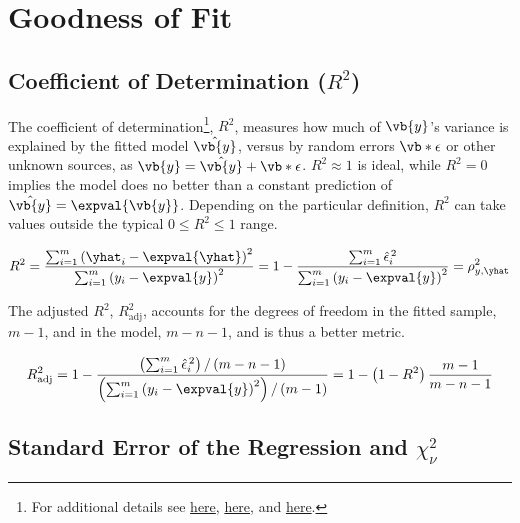 \section{Goodness of Fit}
\label{regression:goodness_of_fit}

\subsection{Coefficient of Determination (\texorpdfstring{$R^{2}$}{R-Squared})}
\label{regression:goodness_of_fit:R2}

The coefficient of determination\footnote{For additional details see
\href{https://economictheoryblog.com/2014/11/05/the-coefficient-of-determination-latex-r2/}{here},
\href{https://economictheoryblog.com/2014/11/05/proof/}{here}, and
\href{http://people.duke.edu/~rnau/rsquared.htm}{here}.}, $R^{2}$,
measures how much of $\vb{y}$'s variance is explained by the fitted model $\hat{\vb{y}}$,
versus by random errors $\vb*{\epsilon}$ or other unknown sources,
as $\vb{y} = \hat{\vb{y}} + \vb*{\epsilon}$.
$R^{2} \approx 1$ is ideal, while
$R^{2} = 0$ implies the model does no better than a constant prediction of $\hat{\vb{y}} = \expval{\vb{y}}$.
Depending on the particular definition,
$R^{2}$ can take values outside the typical $0 \leq R^{2} \leq 1$ range.

\begin{equation}\label{eq:regression:goodness_of_fit:R2}
R^{2} = \frac{
\sum_{i=1}^{m} \left(\yhat_{i} - \expval{\yhat}\right)^{2}
}{
\sum_{i=1}^{m} \left(y_{i} - \expval{y}\right)^{2}
} = 1 - \frac{
\sum_{i=1}^{m} \hat{\epsilon}_{i}^{\,2}
}{
\sum_{i=1}^{m} \left(y_{i} - \expval{y}\right)^{2}
} = \rho_{y,\yhat}^{2}
\end{equation}

The adjusted $R^{2}$, $R^{2}_{\text{adj}}$, accounts for the degrees of freedom in the
fitted sample, $m-1$, and in the model, $m-n-1$, and is thus a better metric.

\begin{equation}\label{eq:regression:goodness_of_fit:R2_adj}
R^{2}_{\text{adj}} = 1 - \frac{
\left(\sum_{i=1}^{m} \hat{\epsilon}_{i}^{\,2}\right)/\left(m-n-1\right)
}{
\left(\sum_{i=1}^{m} \left(y_{i} - \expval{y}\right)^{2}\right)/\left(m-1\right)
}
= 1 - \left(1-R^{2}\right)\frac{m-1}{m-n-1}
\end{equation}

\subsection{Standard Error of the Regression and \texorpdfstring{$\chi_{\nu}^{2}$}{Chi-Nu}}
\label{regression:goodness_of_fit:reduced_chi2}

